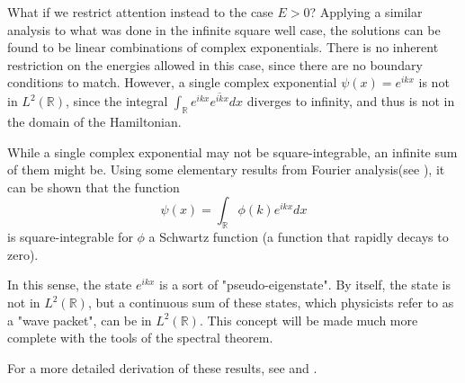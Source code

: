 What if we restrict attention instead to the case $E>0$? Applying a similar
analysis to what was done in the infinite square well case, the solutions can be
found to be linear combinations of complex exponentials. There is no inherent
restriction on the energies allowed in this case, since there are no boundary
conditions to match. However, a single complex exponential $\psi(x) = e^{ikx}$
is not in $L^2(\mathbb{R})$, since the integral
$\int_{\mathbb{R}}e^{ikx}\overline{e^{ikx}}dx$
diverges to infinity, and thus is not in the domain of the Hamiltonian.

While a single complex exponential may not be square-integrable, an infinite sum
of them might be. Using some elementary results from Fourier analysis(see
\cite[Thm. 8.4.1]{Lang1993}), it can be
shown that the function
\[
    \psi(x) = \int_{\mathbb{R}} \phi(k)e^{ikx}dx
\]
is square-integrable for $\phi$ a Schwartz function (a function that rapidly
decays to zero).

In this sense, the state $e^{ikx}$ is a sort of "pseudo-eigenstate". By itself,
the state is not in $L^2(\mathbb{R})$, but a continuous sum of these states,
which physicists refer to as a "wave packet", can
be in $L^2(\mathbb{R})$. This concept will be made much more complete with the
tools of the spectral theorem.

For a more detailed derivation of these results, see \cite[p. 109-120]{Hall2013}
and \cite[p. 78-82]{griffiths2005}.
